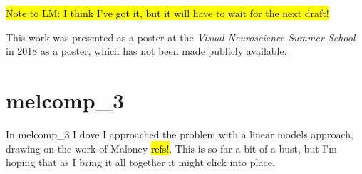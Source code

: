 \documentclass{article}
\begin{document}
\hl{Note to LM: I think I've got it, but it will have to wait for the next draft!}

This work was presented as a poster at the \emph{Visual Neuroscience Summer School} in 2018 as a poster, which has not been made publicly available.

\section{melcomp\_3}

In melcomp\_3 I dove I approached the problem with a linear models approach, drawing on the work of Maloney \hl{refs!}. This is so far a bit of a bust, but I'm hoping that as I bring it all together it might click into place.



\end{document}
